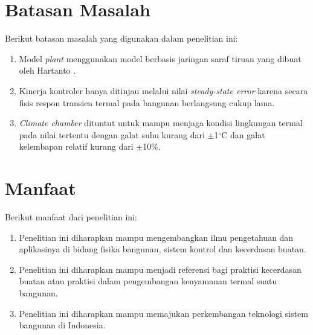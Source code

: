 \section{Batasan Masalah}
Berikut batasan masalah yang digunakan dalam penelitian ini:
\begin{enumerate}
	\item Model \textit{plant} menggunakan model berbasis jaringan saraf tiruan yang dibuat oleh Hartanto \cite{skripsiTanto}.
	\item Kinerja kontroler hanya ditinjau melalui nilai \textit{steady-state error} karena secara fisis respon transien termal pada bangunan berlangsung cukup lama.
	\item \textit{Climate chamber} dituntut untuk mampu menjaga kondisi lingkungan termal pada nilai tertentu dengan galat suhu kurang dari $\pm$1$^{\circ}$C dan galat kelembapan relatif kurang dari $\pm$10\%.
\end{enumerate}
\break

\section{Manfaat}
Berikut manfaat dari penelitian ini:
\begin{enumerate}
	\item Penelitian ini diharapkan mampu mengembangkan ilmu pengetahuan dan aplikasinya di bidang fisika bangunan, sistem kontrol dan kecerdasan buatan.
	\item Penelitian ini diharapkan mampu menjadi referensi bagi praktisi kecerdasan buatan atau praktisi dalam pengembangan kenyamanan termal suatu bangunan.
	\item Penelitian ini diharapkan mampu memajukan perkembangan teknologi sistem bangunan di Indonesia.
\end{enumerate}


